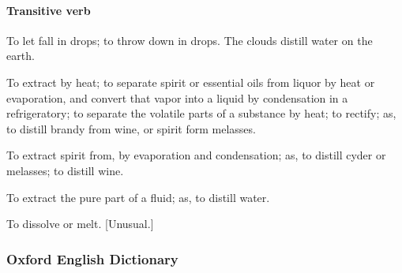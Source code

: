 			\paragraph{Transitive verb}
			
				\begin{compactitem}
					\item[1] To let fall in drops; to throw down in drops. The clouds distill water on the earth.
					\item[2] To extract by heat; to separate spirit or essential oils from liquor by heat or evaporation, and convert that vapor into a liquid by condensation in a refrigeratory; to separate the volatile parts of a substance by heat; to rectify; as, to distill brandy from wine, or spirit form melasses.
					\item[3] To extract spirit from, by evaporation and condensation; as, to distill cyder or melasses; to distill wine.
					\item[4] To extract the pure part of a fluid; as, to distill water.
					\item[5] To dissolve or melt. [Unusual.]
				\end{compactitem}
			
		\subsubsection{Oxford English Dictionary}
			
